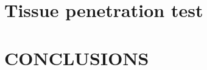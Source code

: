 \documentclass[letterpaper, 10 pt, conference]{ieeeconf}  %
\begin{document}
\section{Tissue penetration test}


   



\section{CONCLUSIONS}


\addtolength{\textheight}{-12cm}   %







\end{document}
